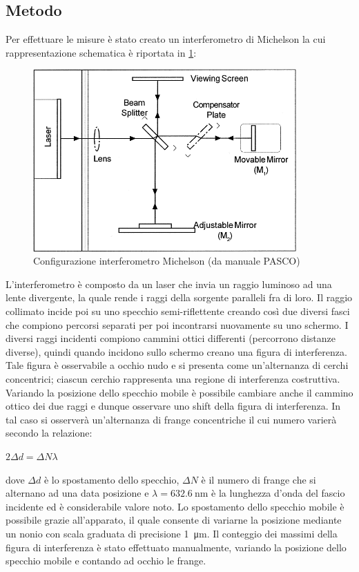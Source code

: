 \documentclass[a4paper]{article}
\begin{document}
\subsection{Metodo}
Per effettuare le misure è stato creato un interferometro di Michelson la cui rappresentazione schematica è riportata in \cref{fig:configurazione-michelson}:
\begin{figure}[htbp]
\centering
\includegraphics[width=0.9\textwidth]{./grafici/configurazione michaelson.png}
\caption{Configurazione interferometro Michelson (da manuale PASCO)}
\label{fig:configurazione-michelson}
\end{figure}
L'interferometro è composto da un laser che invia un raggio luminoso ad una lente divergente, la quale rende i raggi della sorgente paralleli fra di loro. Il raggio collimato incide poi su uno specchio semi-riflettente creando così due diversi fasci che compiono percorsi separati per poi incontrarsi nuovamente su uno schermo. I diversi raggi incidenti compiono cammini ottici differenti (percorrono distanze diverse), quindi quando incidono sullo schermo creano una figura di interferenza. Tale figura è osservabile a occhio nudo e si presenta come un'alternanza di cerchi concentrici; ciascun cerchio rappresenta una regione di interferenza costruttiva. Variando la posizione dello specchio mobile è possibile cambiare anche il cammino ottico dei due raggi e dunque osservare uno shift della figura di interferenza. In tal caso si osserverà un'alternanza di frange concentriche il cui numero varierà secondo la relazione: 
\begin{center}
    $2 \Delta d=\Delta N \lambda $
\end{center}
dove $\Delta d$ è lo spostamento dello specchio, $\Delta N$ è il numero di frange che si alternano ad una data posizione e $\lambda=\SI{632.6}{\nano\meter}$ è la lunghezza d'onda del fascio incidente ed è considerabile valore noto. Lo spostamento dello specchio mobile è possibile grazie all'apparato, il quale consente di variarne la posizione mediante un nonio con scala graduata di precisione \SI{1}{\micro\meter}. Il conteggio dei massimi della figura di interferenza è stato effettuato manualmente, variando la posizione dello specchio mobile e contando ad occhio le frange.
\end{document}
